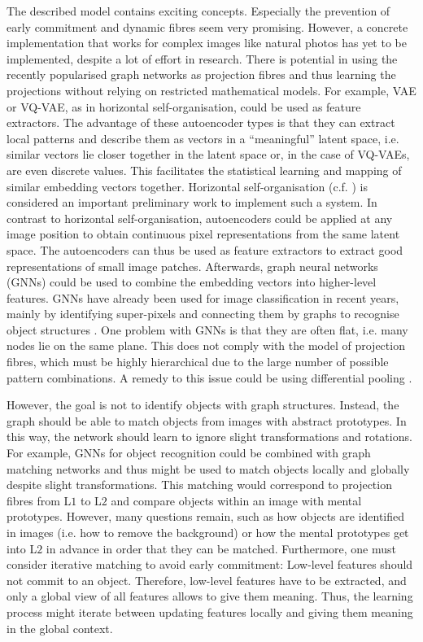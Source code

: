 The described model contains exciting concepts. Especially the prevention of early commitment and dynamic fibres seem very promising. However, a concrete implementation that works for complex images like natural photos has yet to be implemented, despite a lot of effort in research. There is potential in using the recently popularised graph networks as projection fibres and thus learning the projections without relying on restricted mathematical models. For example, VAE or VQ-VAE, as in horizontal self-organisation, could be used as feature extractors. The advantage of these autoencoder types is that they can extract local patterns and describe them as vectors in a ``meaningful'' latent space, i.e. similar vectors lie closer together in the latent space or, in the case of VQ-VAEs, are even discrete values. This facilitates the statistical learning and mapping of similar embedding vectors together. Horizontal self-organisation (c.f. ) is considered an important preliminary work to implement such a system. In contrast to horizontal self-organisation, autoencoders could be applied at any image position to obtain continuous pixel representations from the same latent space. The autoencoders can thus be used as feature extractors to extract good representations of small image patches. Afterwards, graph neural networks (GNNs) could be used to combine the embedding vectors into higher-level features. GNNs have already been used for image classification in recent years, mainly by identifying super-pixels and connecting them by graphs to recognise object structures .  One problem with GNNs is that they are often flat, i.e. many nodes lie on the same plane. This does not comply with the model of projection fibres, which must be highly hierarchical due to the large number of possible pattern combinations. A remedy to this issue could be using differential pooling .

However, the goal is not to identify objects with graph structures. Instead, the graph should be able to match objects from images with abstract prototypes. In this way, the network should learn to ignore slight transformations and rotations. For example, GNNs for object recognition could be combined with graph matching networks  and thus might be used to match objects locally and globally despite slight transformations. This matching would correspond to projection fibres from L$1$ to L$2$ and compare objects within an image with mental prototypes. However, many questions remain, such as how objects are identified in images (i.e. how to remove the background) or how the mental prototypes get into L$2$ in advance in order that they can be matched. Furthermore, one must consider iterative matching to avoid early commitment: Low-level features should not commit to an object. Therefore, low-level features have to be extracted, and only a global view of all features allows to give them meaning. Thus, the learning process might iterate between updating features locally and giving them meaning in the global context.


